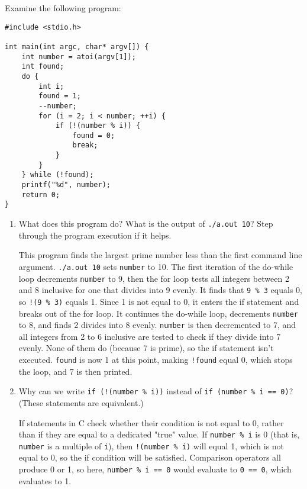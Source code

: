 Examine the following program:

\begin{verbatim}
#include <stdio.h>

int main(int argc, char* argv[]) {
    int number = atoi(argv[1]);
    int found;
    do {
        int i;
        found = 1;
        --number;
        for (i = 2; i < number; ++i) {
            if (!(number % i)) {
                found = 0;
                break;
            }
        }
    } while (!found);
    printf("%d", number);
    return 0;
}
\end{verbatim}

\begin{enumerate}

\item What does this program do? What is the output of \texttt{./a.out 10}? Step through the program execution if it helps.

\begin{answer}
This program finds the largest prime number less than the first command line argument. \texttt{./a.out 10} sets \texttt{number} to 10. The first iteration of the do-while loop decrements \texttt{number} to 9, then the for loop tests all integers between 2 and 8 inclusive for one that divides into 9 evenly. It finds that \texttt{9 \% 3} equals 0, so \texttt{!(9 \% 3)} equals 1. Since 1 is not equal to 0, it enters the if statement and breaks out of the for loop. It continues the do-while loop, decrements \texttt{number} to 8, and finds 2 divides into 8 evenly. \texttt{number} is then decremented to 7, and all integers from 2 to 6 inclusive are tested to check if they divide into 7 evenly. None of them do (because 7 is prime), so the if statement isn't executed. \texttt{found} is now 1 at this point, making \texttt{!found} equal 0, which stops the loop, and 7 is then printed.
\end{answer}



\item Why can we write \texttt{if (!(number \% i))} instead of \texttt{if (number \% i == 0)}? (These statements are equivalent.)

\begin{answer}
If statements in C check whether their condition is not equal to 0, rather than if they are equal to a dedicated "true" value. If \texttt{number \% i} is 0 (that is, \texttt{number} is a multiple of \texttt{i}), then \texttt{!(number \% i)} will equal 1, which is not equal to 0, so the if condition will be satisfied. Comparison operators all produce 0 or 1, so here, \texttt{number \% i == 0} would evaluate to \texttt{0 == 0}, which evaluates to 1.
\end{answer}




\end{enumerate}
